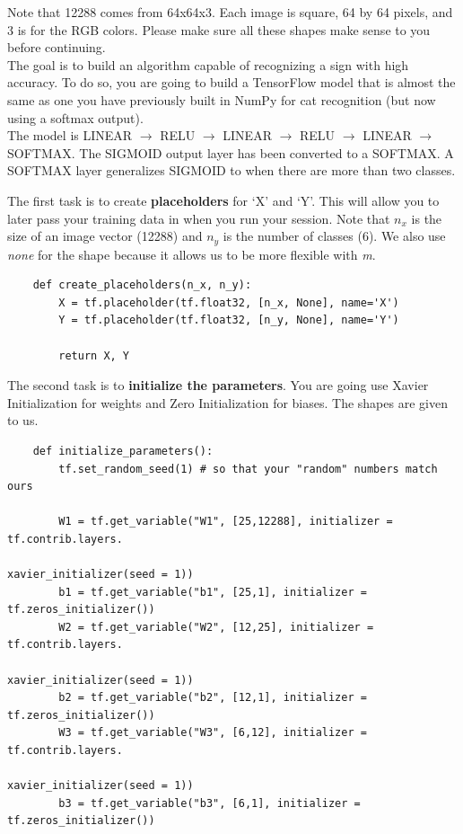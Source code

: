 \documentclass[11pt, a4paper]{article}
\begin{document}
\begin{spacing}{1.1}
	Note that 12288 comes from  64x64x3. Each image is square, 64 by 64 pixels, and 3 is for the RGB colors. Please make sure all these shapes make sense to you before continuing. \vspace*{1mm} \\
	The goal is to build an algorithm capable of recognizing a sign with high accuracy. To do so, you are going to build a TensorFlow model that is almost the same as one you have previously built in NumPy for cat recognition (but now using a softmax output). \vspace*{1mm} \\
	The model is LINEAR $\rightarrow$ RELU $\rightarrow$ LINEAR $\rightarrow$ RELU $\rightarrow$ LINEAR $\rightarrow$ SOFTMAX. The SIGMOID output layer has been converted to a SOFTMAX. A SOFTMAX layer generalizes SIGMOID to when there are more than two classes. \newpage

	\noindent The first task is to create \textbf{placeholders} for `X' and `Y'. This will allow you to later pass your training data in when you run your session. Note that $n_x$ is the size of an image vector (12288) and $n_y$ is the number of classes (6). We also use \textit{none} for the shape because it allows us to be more flexible with \textit{m}.
	\begin{lstlisting}
	def create_placeholders(n_x, n_y):
		X = tf.placeholder(tf.float32, [n_x, None], name='X')
		Y = tf.placeholder(tf.float32, [n_y, None], name='Y')
		
		return X, Y	\end{lstlisting} \vspace*{1mm}
	The second task is to \textbf{initialize the parameters}. You are going use Xavier Initialization for weights and Zero Initialization for biases. The shapes are given to us.
	\begin{lstlisting}
	def initialize_parameters():
		tf.set_random_seed(1) # so that your "random" numbers match ours
		
		W1 = tf.get_variable("W1", [25,12288], initializer = tf.contrib.layers.
		                                                     xavier_initializer(seed = 1))
		b1 = tf.get_variable("b1", [25,1], initializer = tf.zeros_initializer())
		W2 = tf.get_variable("W2", [12,25], initializer = tf.contrib.layers.
		                                                  xavier_initializer(seed = 1))
		b2 = tf.get_variable("b2", [12,1], initializer = tf.zeros_initializer())
		W3 = tf.get_variable("W3", [6,12], initializer = tf.contrib.layers.
		                                                 xavier_initializer(seed = 1))
		b3 = tf.get_variable("b3", [6,1], initializer = tf.zeros_initializer())
		

\end{lstlisting}
\end{spacing}
\end{document}
